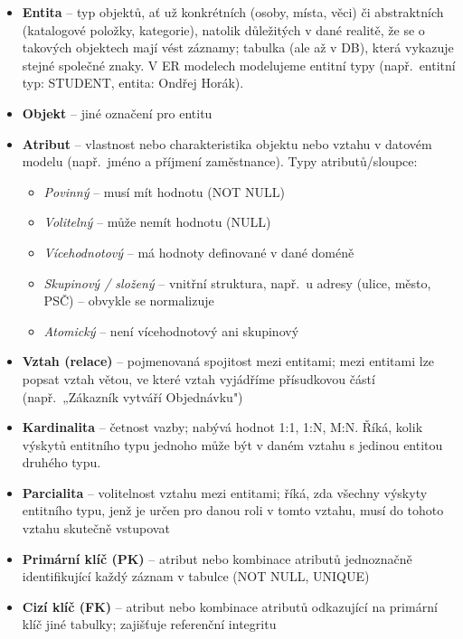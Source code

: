 \documentclass[12pt,a4paper]{article}
\begin{document}
\begin{itemize}
  \item \textbf{Entita} -- typ objektů, ať už konkrétních (osoby, místa, věci) či abstraktních
    (katalogové položky, kategorie), natolik důležitých v dané realitě, že se o takových objektech
    mají vést záznamy; tabulka (ale až v DB), která vykazuje stejné společné znaky. V ER modelech
    modelujeme entitní typy (např.\ entitní typ: STUDENT, entita: Ondřej Horák).
  \item \textbf{Objekt} -- jiné označení pro entitu
  \item \textbf{Atribut} -- vlastnost nebo charakteristika objektu nebo vztahu v datovém modelu
    (např.\ jméno a příjmení zaměstnance). Typy atributů/sloupce:
    \begin{itemize}
      \item \textit{Povinný} -- musí mít hodnotu (NOT NULL)
      \item \textit{Volitelný} -- může nemít hodnotu (NULL)
      \item \textit{Vícehodnotový} -- má hodnoty definované v dané doméně
      \item \textit{Skupinový / složený} -- vnitřní struktura, např.\ u adresy (ulice, město, PSČ) --
        obvykle se normalizuje
      \item \textit{Atomický} -- není vícehodnotový ani skupinový
    \end{itemize}
  \item \textbf{Vztah (relace)} -- pojmenovaná spojitost mezi entitami; mezi entitami lze popsat
    vztah větou, ve které vztah vyjádříme přísudkovou částí (např.\ „Zákazník vytváří Objednávku")
  \item \textbf{Kardinalita} -- četnost vazby; nabývá hodnot 1:1, 1:N, M:N. Říká, kolik výskytů
    entitního typu jednoho může být v daném vztahu s jedinou entitou druhého typu.
  \item \textbf{Parcialita} -- volitelnost vztahu mezi entitami; říká, zda všechny výskyty entitního
    typu, jenž je určen pro danou roli v tomto vztahu, musí do tohoto vztahu skutečně vstupovat
  \item \textbf{Primární klíč (PK)} -- atribut nebo kombinace atributů jednoznačně identifikující
    každý záznam v tabulce (NOT NULL, UNIQUE)
  \item \textbf{Cizí klíč (FK)} -- atribut nebo kombinace atributů odkazující na primární klíč jiné
    tabulky; zajišťuje referenční integritu
\end{itemize}
\end{document}
